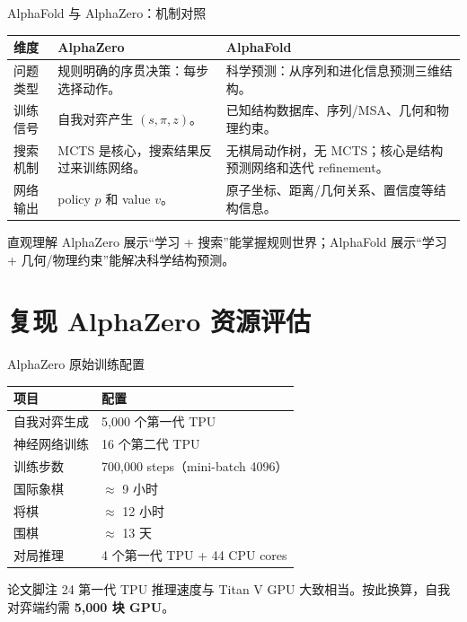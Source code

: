 \documentclass[UTF8,aspectratio=169,10pt]{ctexbeamer}
\begin{document}
\begin{frame}{AlphaFold 与 AlphaZero：机制对照}
  \footnotesize
  \begin{center}
    \begin{tabular}{@{}>{\raggedright\arraybackslash}p{}>{\raggedright\arraybackslash}p{}>{\raggedright\arraybackslash}p{}@{}}
      \toprule
      维度 & AlphaZero & AlphaFold \\
      \midrule
      问题类型 &
      规则明确的序贯决策：每步选择动作。 &
      科学预测：从序列和进化信息预测三维结构。 \\
      训练信号 &
      自我对弈产生 $(s,\pi,z)$。 &
      已知结构数据库、序列/MSA、几何和物理约束。 \\
      搜索机制 &
      MCTS 是核心，搜索结果反过来训练网络。 &
      无棋局动作树，无 MCTS；核心是结构预测网络和迭代 refinement。 \\
      网络输出 &
      policy $p$ 和 value $v$。 &
      原子坐标、距离/几何关系、置信度等结构信息。 \\
      \bottomrule
    \end{tabular}
  \end{center}

  \begin{block}{直观理解}
    AlphaZero 展示“学习 + 搜索”能掌握规则世界；AlphaFold 展示“学习 + 几何/物理约束”能解决科学结构预测。
  \end{block}
\end{frame}

\section{复现 AlphaZero 资源评估}

\begin{frame}{AlphaZero 原始训练配置}
  \footnotesize
  \begin{center}
    \begin{tabular}{@{}p{}p{}@{}}
      \toprule
      项目 & 配置 \\
      \midrule
      自我对弈生成 & 5,000 个第一代 TPU \\
      神经网络训练 & 16 个第二代 TPU \\
      训练步数 & 700,000 steps（mini-batch 4096）\\
      国际象棋 & $\approx$ 9 小时 \\
      将棋 & $\approx$ 12 小时 \\
      围棋 & $\approx$ 13 天 \\
      对局推理 & 4 个第一代 TPU + 44 CPU cores \\
      \bottomrule
    \end{tabular}
  \end{center}

  \begin{alertblock}{论文脚注 24}
    第一代 TPU 推理速度与 Titan V GPU 大致相当。按此换算，自我对弈端约需 \textbf{5,000 块 GPU}。
  \end{alertblock}
\end{frame}
\end{document}
